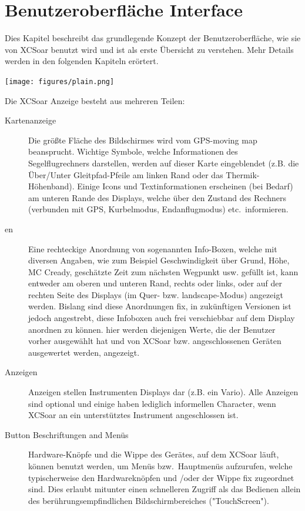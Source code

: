 \chapter{Benutzeroberfläche Interface}\label{cha:interface}
\warning\halt
Dies Kapitel beschreibt das grundlegende  Konzept der Benutzeroberfläche, wie sie von \textsf{XCSoar} benutzt wird und ist als erste Übersicht zu verstehen. Mehr Details werden in den folgenden Kapiteln erörtert.


\begin{center}
\texttt{[image: figures/plain.png]}
\end{center}

Die  \textsf{XCSoar} Anzeige besteht aus mehreren Teilen:
\begin{description}
\item[Kartenanzeige] Die größte Fläche des Bildschirmes wird vom GPS-moving map beansprucht.
Wichtige Symbole, welche Informationen des Segelflugrechners darstellen, werden auf dieser Karte
eingeblendet (z.B. die Über/Unter Gleitpfad-Pfeile am linken Rand oder das Thermik-Höhenband).
Einige Icons und Textinformationen  erscheinen  (bei Bedarf) am unteren Rande des Displays,
welche über den Zustand des Rechners (verbunden mit GPS, Kurbelmodus, Endanflugmodus) etc.\  informieren.
%
\item[{\InfoBox}en] Eine rechteckige Anordnung von sogenannten Info-Boxen, welche mit diversen Angaben, wie zum Beispiel Geschwindigkeit über Grund,
Höhe, MC Cready, geschätzte Zeit zum nächsten Wegpunkt usw. gefüllt ist, kann entweder am oberen und unteren Rand, rechts oder links,
oder auf der rechten Seite des Displays (im Quer- bzw. landscape-Modus) angezeigt werden. Bislang sind diese Anordnungen fix, in zukünftigen Versionen ist jedoch angestrebt, diese Infoboxen auch frei verschiebbar auf dem Display anordnen zu können.
    hier werden diejenigen Werte, die der Benutzer vorher ausgewählt
    hat und von \textsf{XCSoar} bzw. angeschlossenen Geräten ausgewertet werden,
    angezeigt.
%
\item[Anzeigen] Anzeigen stellen Instrumenten Displays dar (z.B. ein Vario). Alle Anzeigen sind optional und einige
haben lediglich informellen  Character, wenn \textsf{XCSoar} an ein unterstütztes Instrument angeschlossen ist.
%
\item[Button Beschriftungen and Menüs] Hardware-Knöpfe und die Wippe des Gerätes, auf dem \textsf{XCSoar} läuft, können benutzt werden, um Menüs bzw.\ Hauptmenüs aufzurufen, welche typischerweise den Hardwareknöpfen und /oder der Wippe fix zugeordnet sind. Dies erlaubt mitunter einen schnelleren Zugriff als das Bedienen allein des berührungsempfindlichen Bildschirmbereiches ("TouchScreen").

\end{description}
